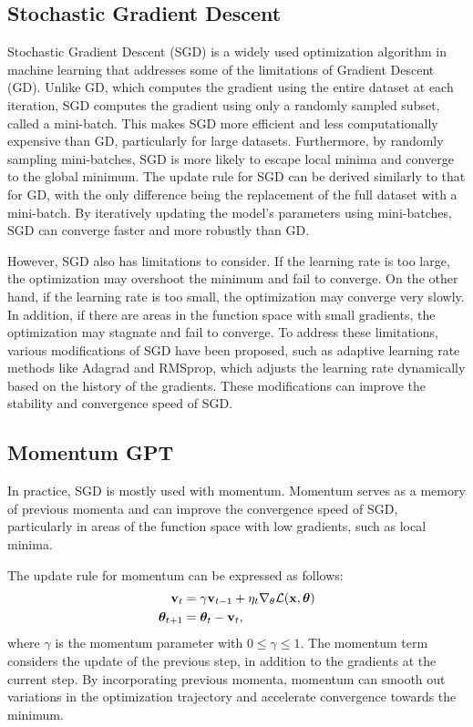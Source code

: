\subsection{Stochastic Gradient Descent}
Stochastic Gradient Descent (SGD) is a widely used optimization algorithm in machine learning that addresses some of the limitations of Gradient Descent (GD).
Unlike GD, which computes the gradient using the entire dataset at each iteration, SGD computes the gradient using only a randomly sampled subset, called a mini-batch.
This makes SGD more efficient and less computationally expensive than GD, particularly for large datasets.
Furthermore, by randomly sampling mini-batches, SGD is more likely to escape local minima and converge to the global minimum.
The update rule for SGD can be derived similarly to that for GD, with the only difference being the replacement of the full dataset with a mini-batch.
By iteratively updating the model's parameters using mini-batches, SGD can converge faster and more robustly than GD.

However, SGD also has limitations to consider. If the learning rate is too large, the optimization may overshoot the minimum and fail to converge.
On the other hand, if the learning rate is too small, the optimization may converge very slowly.
In addition, if there are areas in the function space with small gradients, the optimization may stagnate and fail to converge.
To address these limitations, various modifications of SGD have been proposed, such as adaptive learning rate methods like Adagrad and RMSprop,
which adjusts the learning rate dynamically based on the history of the gradients.
These modifications can improve the stability and convergence speed of SGD.


\subsection{Momentum GPT}

In practice, SGD is mostly used with momentum.
Momentum serves as a memory of previous momenta and can improve the convergence speed of SGD, particularly in areas of the function space with low gradients, such as local minima.

The update rule for momentum can be expressed as follows:
\begin{align}
\bold{v}_t &= \gamma \bold{v}_{t-1} + \eta_t \nabla_\theta \mathcal{L}(\bold{x}, \boldsymbol{\theta}) \\
\boldsymbol{\theta}_{t+1} &= \boldsymbol{\theta}_t - \bold{v}_t,
\end{align}
where $\gamma$ is the momentum parameter with $0 \leq \gamma \leq 1$.
The momentum term considers the update of the previous step, in addition to the gradients at the current step.
By incorporating previous momenta, momentum can smooth out variations in the optimization trajectory and accelerate convergence towards the minimum.

